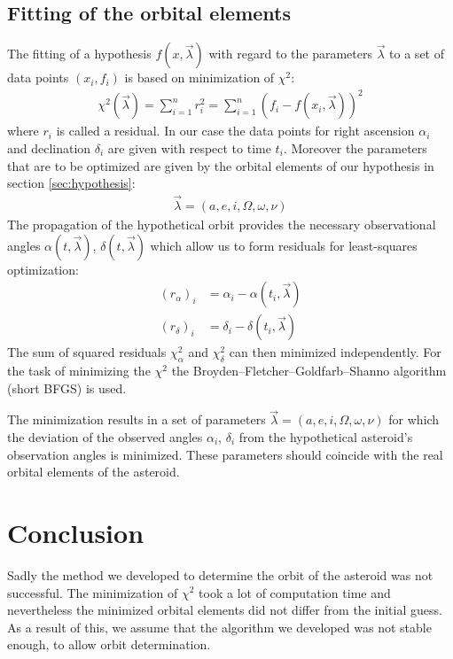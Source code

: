 \documentclass[11pt, a4paper]{article}
\numberwithin{equation}{section}
\begin{document}
\subsection{Fitting of the orbital elements}
The fitting of a hypothesis $f(x, \vec{\lambda})$ with regard to the parameters $\vec{\lambda}$ to a set of data points $(x_i, f_i)$ is based on minimization of $\chi^2$:
\begin{align}
	\chi^2(\vec{\lambda}) = \sum_{i = 1}^{n} r_i^2 = \sum_{i = 1}^{n} \left( f_i - f(x_i, \vec{\lambda}) \right)^2
\end{align}
where $r_i$ is called a residual.
In our case the data points for right ascension $\alpha_i$ and declination $\delta_i$ are given with respect to time $t_i$.
Moreover the parameters that are to be optimized are given by the orbital elements of our hypothesis in section \ref{sec:hypothesis}:
\begin{align}
	\vec{\lambda} = (a, e, i, \Omega, \omega, \nu)
\end{align}
The propagation of the hypothetical orbit provides the necessary observational angles $\alpha(t, \vec{\lambda})$, $\delta(t, \vec{\lambda})$ which allow us to form residuals for least-squares optimization:
\begin{align}
	(r_\alpha)_i &= \alpha_i - \alpha(t_i, \vec{\lambda}) \\
	(r_\delta)_i &= \delta_i - \delta(t_i, \vec{\lambda})
\end{align}
The sum of squared residuals $\chi_\alpha^2$ and $\chi_\delta^2$ can then minimized independently.
For the task of minimizing the $\chi^2$ the Broyden–Fletcher–Goldfarb–Shanno algorithm (short BFGS) is used.

The minimization results in a set of parameters $\vec{\lambda} = (a, e, i, \Omega, \omega, \nu)$ for which the deviation of the observed angles $\alpha_i$, $\delta_i$ from the hypothetical asteroid's observation angles is minimized.
These parameters should coincide with the real orbital elements of the asteroid.

\section{Conclusion}
Sadly the method we developed to determine the orbit of the asteroid was not successful.
The minimization of $\chi^2$ took a lot of computation time and nevertheless the minimized orbital elements did not differ from the initial guess.
As a result of this, we assume that the algorithm we developed was not stable enough, to allow orbit determination.
\end{document}
